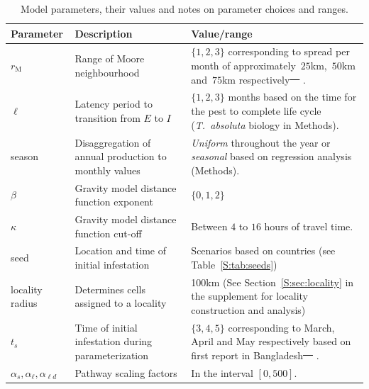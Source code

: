 \documentclass[11pt]{article}
\newcommand{\tuta}{\emph{T.~absoluta}}
\newcommand{\infest}{\rho}
\newcommand{\suitable}{\epsilon}
\newcommand{\asd}{\alpha_s}
\newcommand{\afm}{\alpha_{\ell}}
\newcommand{\ald}{\alpha_{\ell d}}
\newcommand{\mooreRange}{r_\mathrm{M}}
\theoremstyle{definition}
\providecommand{\DIFdeltex}[1]{{\protect\color{red}\sout{#1}}}                      %
\providecommand{\DIFdelFL}[1]{\DIFdel{#1}} %
\providecommand{\DIFdelbeginFL}{} %
\providecommand{\DIFdelendFL}{} %
\providecommand{\DIFdel}[1]{\texorpdfstring{\DIFdeltex{#1}}{}} %
\newcommand{\DIFscaledelfig}{0.5}
\newlength{\DIFdelgraphicswidth} %
\newlength{\DIFdelgraphicsheight} %
\newcommand{\DIFdelincludegraphics}[2][]{%
\sbox{\DIFdelgraphicsbox}{\DIFOincludegraphics[#1]{#2}}%
\settoboxwidth{\DIFdelgraphicswidth}{\DIFdelgraphicsbox} %
\settoboxtotalheight{\DIFdelgraphicsheight}{\DIFdelgraphicsbox} %
\scalebox{\DIFscaledelfig}{%
\parbox[b]{\DIFdelgraphicswidth}{\usebox{\DIFdelgraphicsbox}\\[-\baselineskip] \rule{\DIFdelgraphicswidth}{0em}}\llap{\resizebox{\DIFdelgraphicswidth}{\DIFdelgraphicsheight}{%
\setlength{\unitlength}{\DIFdelgraphicswidth}%
\begin{picture}(1,1)%
\thicklines\linethickness{2pt} %
{\color[rgb]{1,0,0}\put(0,0){\framebox(1,1){}}}%
{\color[rgb]{1,0,0}\put(0,0){\line( 1,1){1}}}%
{\color[rgb]{1,0,0}\put(0,1){\line(1,-1){1}}}%
\end{picture}%
}\hspace*{3pt}}} %
} %
\DeclareRobustCommand{\DIFdelbeginFL}{\DIFOdelbeginFL \let\includegraphics\DIFdelincludegraphics} %
\DeclareRobustCommand{\DIFdelendFL}{\DIFOaddendFL \let\includegraphics\DIFOincludegraphics} %
\begin{document}
\begin{table}[t]
\caption{Model parameters, their values and notes on parameter choices and
ranges.\label{tab:param}}
    \centering
	\small
{} %
    \begin{tabular}{p{}p{}p{}}
		\hline		
		Parameter & Description & Value/range \\
\hline		
\hline
$\mooreRange$ & Range of Moore neighbourhood & $\{1,2,3\}$ corresponding to
spread per month of 
approximately~$25$km,~$50$km and~$75$km
respectively\DIFdelbeginFL \DIFdelFL{~\mbox{%
\cite{guimapi2016modeling,martins2018assessing}}\hspace{0pt}%
}\DIFdelendFL . \\
$\ell$ & Latency period to transition from $E$ to $I$ & $\{1,2,3\}$ months
based on the time for the pest to complete life cycle (\tuta{} biology in
Methods). \\
season & Disaggregation of annual production to monthly values
& \emph{Uniform} throughout the year or \emph{seasonal} based on regression
analysis (Methods). \\
$\beta$ & Gravity model distance function exponent & $\{0,1,2\}$ \\
$\kappa$ & Gravity model distance function cut-off & Between $4$ to $16$ hours
of travel time. \\
seed & Location and time of initial infestation & Scenarios based on
countries (see Table~\ref{S:tab:seeds})\\
locality radius & Determines cells assigned to a locality & 100km (See
Section~\ref{S:sec:locality} in the supplement for locality construction
and analysis) \\\hline
$t_s$ & Time of initial infestation during parameterization & $\{3,4,5\}$ corresponding
to March, April and May respectively based on first report in
Bangladesh\DIFdelbeginFL \DIFdelFL{~\mbox{%
\cite{hossain2016first}}\hspace{0pt}%
}\DIFdelendFL . \\
$\asd,\afm,\ald$ & Pathway scaling factors & In the interval $[0,500]$.\\
\hline
\end{tabular}
\end{table}
\end{document}
